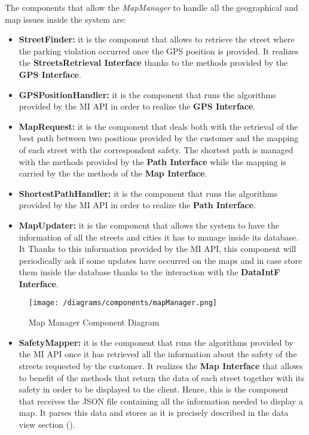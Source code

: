 			The components that allow the \emph{MapManager} to handle all the geographical and map issues inside the system are:
			
			\begin{itemize}
				\item \textbf{StreetFinder:} it is the component that allows to retrieve the street where the parking violation occurred once the GPS position is provided. It realizes the \textbf{StreetsRetrieval Interface} thanks to the methods provided by the \textbf{GPS Interface}.
				
				\item \textbf{GPSPositionHandler:} it is the component that runs the algorithms provided by the MI API in order to realize the \textbf{GPS Interface}.
				
				\item \textbf{MapRequest:} it is the component that deals both with the retrieval of the best path between two positions provided by the customer and the mapping of each street with the correspondent safety. The shortest path is managed with the methods provided by the \textbf{Path Interface} while the mapping is carried by the the methods of the \textbf{Map Interface}. 
							
				\item \textbf{ShortestPathHandler:} it is the component that runs the algorithms provided by the MI API in order to realize the \textbf{Path Interface}.
				
				\item \textbf{MapUpdater:} it is the component that allows the system to have the information of all the streets and cities it has to manage inside its database. It Thanks to this information provided by the MI API, this component will periodically ask if some updates have occurred on the maps and in case store them inside the database thanks to the interaction with the \textbf{DataIntF Interface}.
			\end{itemize}
			
			\begin{figure}[ht]
				\centering
				\texttt{[image: /diagrams/components/mapManager.png]}
				\caption{\label{fig:mapManagerComp} Map Manager Component Diagram}
			\end{figure}
		
			\begin{itemize}
				\item \textbf{SafetyMapper:} it is the component that runs the algorithms provided by the MI API once it has retrieved all the information about the safety of the streets requested by the customer. It realizes the \textbf{Map Interface} that allows to benefit of the methods that return the data of each street together with its safety in order to be displayed to the client. Hence, this is the component that receives the JSON file containing all the information needed to display a map. It parses this data and stores as it is precisely described in the data view section ().
			\end{itemize}
		
